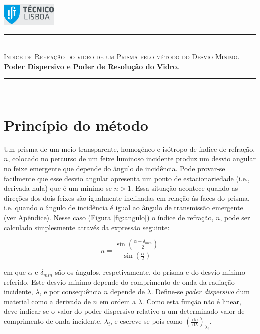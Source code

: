 \documentclass[a4paper,12pt]{article}  %
\author{Prof. Bernardo B. Carvalho}
\date{ Outubro 2012}
\newcommand{\ud}{\,\mathrm{d}}
\newcommand{\HRule}{\rule{\linewidth}{0.5mm}}
\begin{document}
 

	\includegraphics[width=0.2\textwidth]{../logo-ist}%

	\HRule \\[0.5cm]
	{ \huge \sf  \textsc{Indice de Refração do vidro de um Prisma pelo método  do Desvio Mínimo.}} \\[0.4cm] %
	{ \large \bfseries Poder Dispersivo e Poder de Resolução do Vidro.}\\
	\HRule \\%

\section{\sf Princípio do método}
Um prisma de um meio transparente, homogéneo e isótropo de índice de refração, $n$, colocado no percurso de um feixe luminoso incidente produz um desvio angular no feixe emergente que depende do ângulo de incidência. Pode provar-se facilmente que esse desvio angular apresenta um ponto de estacionariedade (i.e., derivada nula) que é um mínimo se $n > 1$. 
Essa situação acontece quando as direções dos dois feixes são igualmente inclinadas em relação às faces do prisma, i.e. quando o ângulo de incidência é igual ao ângulo de transmissão 
emergente (ver Apêndice). 
Nesse caso  (Figura \ref{fig:angulo}) o índice de refração, $n$, pode ser calculado simplesmente através da expressão seguinte: 

\begin{equation}
	\label{eq:desviomim}
	n= \frac{\sin \left( \frac{\alpha+ \delta_{min}}{2} \right) } {\sin \left(  \frac{\alpha}{2} \right)}  
\end{equation}

em que $\alpha$ e  $\delta_{min}$ são os ângulos, respetivamente, do prisma e do desvio mínimo referido. Este desvio mínimo depende do comprimento de onda da radiação incidente, $\lambda$, e por consequência $n$ depende de $\lambda$. Define-se \emph{poder dispersivo} dum material como a derivada de $n$ em ordem a $\lambda$. Como esta função não é linear, deve indicar-se o valor do poder dispersivo relativo a um determinado valor de comprimento de onda incidente,  $\lambda_i$,  e escreve-se pois como $\left( \frac{\ud n}{\ud \lambda } \right)_{\lambda_i}$.
\end{document}
